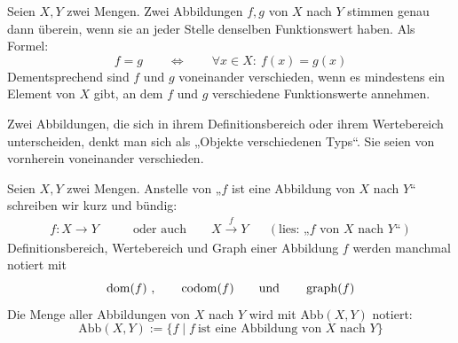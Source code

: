 \begin{axiom} \label{abbgleich}
    Seien $X,Y$ zwei Mengen. Zwei Abbildungen $f,g$ von $X$ nach $Y$ stimmen genau dann überein, wenn sie an jeder Stelle denselben Funktionswert haben. Als Formel:
        \[ f=g \qquad\Leftrightarrow\qquad \forall x\in X:\ f(x)=g(x) \]
    Dementsprechend sind $f$ und $g$ voneinander verschieden, wenn es mindestens ein Element von $X$ gibt, an dem $f$ und $g$ verschiedene Funktionswerte annehmen.
    
    Zwei Abbildungen, die sich in ihrem Definitionsbereich oder ihrem Wertebereich unterscheiden, denkt man sich als „Objekte verschiedenen Typs“. Sie seien von vornherein voneinander verschieden.
\end{axiom}


\begin{nota}
    Seien $X,Y$ zwei Mengen.
    Anstelle von „$f$ ist eine Abbildung von $X$ nach $Y$“ schreiben wir kurz und bündig:
    \begin{align*}
        f:X \to Y \qquad & \text{oder auch}\qquad X\xrightarrow{f} Y && (\text{lies: „$f$ von $X$ nach $Y$“})
    \end{align*}
    Definitionsbereich, Wertebereich und Graph einer Abbildung $f$ werden manchmal notiert mit
        \[ \operatorname{dom}(f)\ , \qquad \operatorname{codom}(f) \qquad\text{und}\qquad \operatorname{graph}(f)\]
    Die Menge aller Abbildungen von $X$ nach $Y$ wird mit $\text{Abb}(X,Y)$ notiert:
        \[ \text{Abb}(X,Y) := \{ f \mid f\ \text{ist eine Abbildung von $X$ nach $Y$} \} \]
\end{nota}


